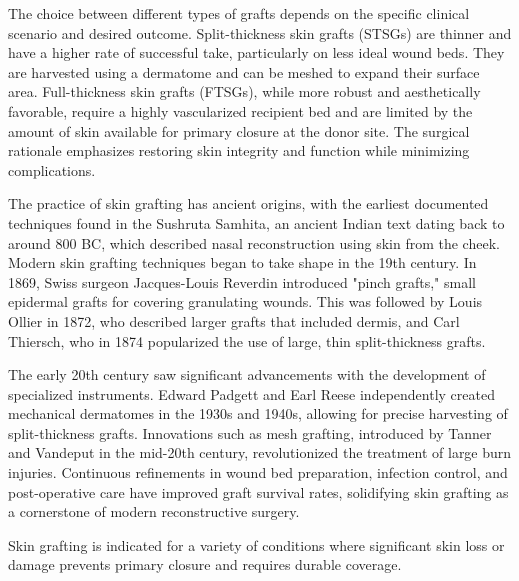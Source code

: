 The choice between different types of grafts depends on the specific clinical scenario and desired outcome. Split-thickness skin grafts (STSGs) are thinner and have a higher rate of successful take, particularly on less ideal wound beds. They are harvested using a dermatome and can be meshed to expand their surface area. Full-thickness skin grafts (FTSGs), while more robust and aesthetically favorable, require a highly vascularized recipient bed and are limited by the amount of skin available for primary closure at the donor site. The surgical rationale emphasizes restoring skin integrity and function while minimizing complications.

The practice of skin grafting has ancient origins, with the earliest documented techniques found in the Sushruta Samhita, an ancient Indian text dating back to around 800 BC, which described nasal reconstruction using skin from the cheek. Modern skin grafting techniques began to take shape in the 19th century. In 1869, Swiss surgeon Jacques-Louis Reverdin introduced "pinch grafts," small epidermal grafts for covering granulating wounds. This was followed by Louis Ollier in 1872, who described larger grafts that included dermis, and Carl Thiersch, who in 1874 popularized the use of large, thin split-thickness grafts.

The early 20th century saw significant advancements with the development of specialized instruments. Edward Padgett and Earl Reese independently created mechanical dermatomes in the 1930s and 1940s, allowing for precise harvesting of split-thickness grafts. Innovations such as mesh grafting, introduced by Tanner and Vandeput in the mid-20th century, revolutionized the treatment of large burn injuries. Continuous refinements in wound bed preparation, infection control, and post-operative care have improved graft survival rates, solidifying skin grafting as a cornerstone of modern reconstructive surgery.

Skin grafting is indicated for a variety of conditions where significant skin loss or damage prevents primary closure and requires durable coverage. 

